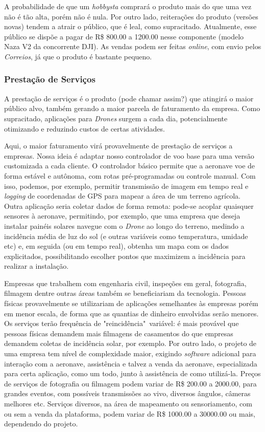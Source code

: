 A probabilidade de que um \emph{hobbysta} comprará o produto mais do que uma vez não é tão alta, porém não é nula. Por outro lado,
reiterações do produto (versões novas) tendem a atrair o público, que é leal, como supracitado. Atualmente, esse público se dispõe
a pagar de R\$ 800.00 a 1200.00 nesse componente (modelo Naza V2 da concorrente DJI). As vendas podem ser feitas \emph{online}, com
envio pelos \emph{Correios}, já que o produto é bastante pequeno.

\subsubsection*{Prestação de Serviços}

A prestação de serviços é o produto (pode chamar assim?) que atingirá o maior público alvo, também gerando a maior parcela de 
faturamento da empresa. Como supracitado, aplicações para \emph{Drones} surgem a cada dia, potencialmente otimizando e reduzindo
custos de certas atividades.

Aqui, o maior faturamento virá provavelmente de prestação de serviços a empresas. Nossa ideia é adaptar nosso controlador de voo
base para uma versão customizada a cada cliente. O controlador básico permite que a aeronave voe de forma estável e autônoma, com rotas
pré-programadas ou controle manual. Com isso, podemos, por exemplo, permitir transmissão de imagem em tempo real e \emph{logging} de coordenadas
de GPS para mapear a área de um terreno agrícola. Outra aplicação seria coletar dados de forma remota: pode-se acoplar quaisquer sensores à aeronave, 
permitindo, por exemplo, que uma empresa que deseja instalar painéis solares navegue com o \emph{Drone} ao longo do terreno, medindo a incidência média
de luz do sol (e outras variáveis como temperatura, umidade etc) e, em seguida (ou em tempo real), obtenha um mapa com os dados explicitados, possibilitando
escolher pontos que maximizem a incidência para realizar a instalação.

Empresas que trabalhem com engenharia civil, inspeções em geral, fotografia, filmagem dentre outras áreas também se beneficiariam da tecnologia.
Pessoas físicas provavelmente se utilizariam de aplicações semelhantes às empresas porém em menor escala, de forma que as quantias de dinheiro
envolvidas serão menores. Os serviços terão frequência de "reincidência"\ variável: é mais provável que pessoas físicas demandem mais filmagens de casamentos
do que empresas demandem coletas de incidência solar, por exemplo. Por outro lado, o projeto de uma empresa tem nível de complexidade maior, exigindo
\emph{software} adicional para interação com a aeronave, assistência e talvez a venda da aeronave, especializada para certa aplicação, como um todo, junto
à assistência de como utilizá-la. Preços de serviços de fotografia ou filmagem podem variar de R\$ 200.00 a 2000.00, para grandes eventos, com possíveis
transmissões ao vivo, diversos ângulos, câmeras melhores etc. Serviços diversos, na área de mapeamento ou sensoriamento, com ou sem a venda da plataforma,
podem variar de R\$ 1000.00 a 30000.00 ou mais, dependendo do projeto.

